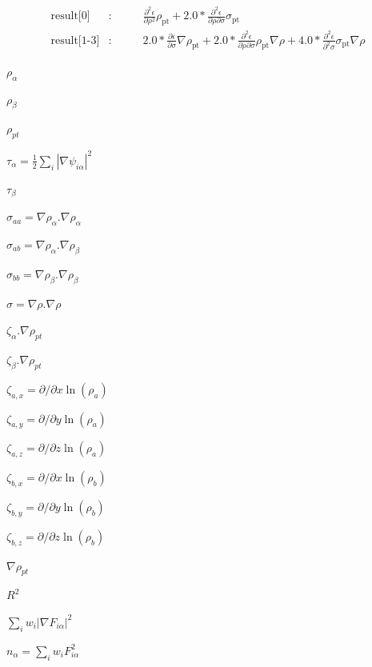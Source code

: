 \documentclass{article}
\begin{document}
\begin{eqnarray*}
    \mbox{result[0]}    &:& \qquad \frac{\partial^2 \epsilon}{\partial \rho^2} \rho_\mathrm{pt}
                            + 2.0 * \frac{\partial^2 \epsilon}{\partial \rho\partial\sigma}\sigma_\mathrm{pt}\\
    \mbox{result[1-3]}  &:& \qquad 2.0 * \frac{\partial\epsilon}{\partial\sigma}\nabla\rho_\mathrm{pt}
                            + 2.0 * \frac{\partial^2\epsilon}{\partial\rho\partial\sigma} \rho_\mathrm{pt}\nabla\rho
                            + 4.0 * \frac{\partial^2\epsilon}{\partial^2\sigma} \sigma_\mathrm{pt}\nabla\rho
\end{eqnarray*}
\pagebreak

$ \rho_\alpha $
\pagebreak

$ \rho_\beta $
\pagebreak

$ \rho_{pt} $
\pagebreak

$ \tau_\alpha = \frac{1}{2}\sum_i|\nabla\psi_{i\alpha}|^2 $
\pagebreak

$ \tau_\beta $
\pagebreak

$ \sigma_{aa} = \nabla \rho_{\alpha}.\nabla \rho_{\alpha} $
\pagebreak

$ \sigma_{ab} = \nabla \rho_{\alpha}.\nabla \rho_{\beta} $
\pagebreak

$ \sigma_{bb} = \nabla \rho_{\beta}.\nabla \rho_{\beta} $
\pagebreak

$ \sigma = \nabla \rho.\nabla \rho $
\pagebreak

$ \zeta_{\alpha}.\nabla\rho_{pt} $
\pagebreak

$ \zeta_{\beta}.\nabla\rho_{pt} $
\pagebreak

$ \zeta_{a,x}=\partial/{\partial x} \ln(\rho_a)  $
\pagebreak

$ \zeta_{a,y}=\partial/{\partial y} \ln(\rho_a)  $
\pagebreak

$ \zeta_{a,z}=\partial/{\partial z} \ln(\rho_a)  $
\pagebreak

$ \zeta_{b,x} = \partial/{\partial x} \ln(\rho_b)  $
\pagebreak

$ \zeta_{b,y} = \partial/{\partial y} \ln(\rho_b)  $
\pagebreak

$ \zeta_{b,z} = \partial/{\partial z} \ln(\rho_b)  $
\pagebreak

$ \nabla\rho_{pt}$
\pagebreak

$ R^2 $
\pagebreak

$ \sum_i w_i|\nabla F_{i\alpha}|^2 $
\pagebreak

$ n_\alpha=\sum_i w_iF_{i\alpha}^2 $
\pagebreak
\end{document}
